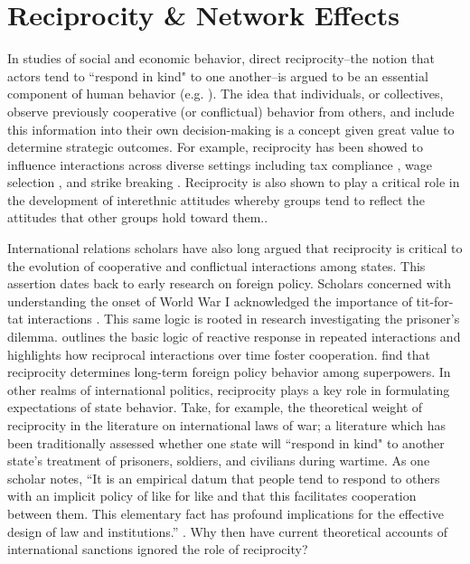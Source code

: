 
\section*{Reciprocity \& Network Effects}
\label{neteffects}
In studies of social and economic behavior, direct reciprocity--the notion that actors tend to ``respond in kind" to one another--is argued to be an essential component of human behavior (e.g. \cite{bolton:1998, charness:2002, charness:2004, cox:2007, cox:2004}). The idea that individuals, or collectives, observe previously cooperative (or conflictual) behavior from others, and include this information into their own decision-making is a concept given great value to determine strategic outcomes. For example, reciprocity has been showed to influence  interactions across diverse settings including tax compliance \citep{smith:1990}, wage selection \citep{campbell:1997}, and strike breaking \citep{brett:1998}. Reciprocity is also shown to play a critical role in the development of interethnic attitudes whereby groups tend to reflect the attitudes that other groups hold toward them.\citep{berry:1979}. %

International relations scholars have also long argued that reciprocity is critical to the evolution of cooperative and conflictual interactions among states. This assertion dates back to early research on foreign policy. Scholars concerned with understanding the onset of World War I acknowledged the importance of tit-for-tat interactions \citep{holsti1972}. This same logic is rooted in research investigating the prisoner's dilemma. \cite{axelrod:1985} outlines the basic logic of reactive response in repeated interactions and highlights how reciprocal interactions over time foster cooperation. \cite{rajmaira:1990} find that reciprocity determines long-term foreign policy behavior among superpowers. In other realms of international politics, reciprocity plays a key role in formulating expectations of state behavior. Take, for example, the theoretical weight of reciprocity in the literature on international laws of war; a literature which has been traditionally assessed whether one state will ``respond in kind" to another state's treatment of prisoners, soldiers, and civilians during wartime. As one scholar notes, ``It is an empirical datum that people tend to respond to others with an implicit policy of like for like and that this facilitates cooperation between them. This elementary fact has profound implications for the effective design of law and institutions.'' \cite[p. 19]{osiel:2009}. Why then have current theoretical accounts of international sanctions ignored the role of reciprocity? 

